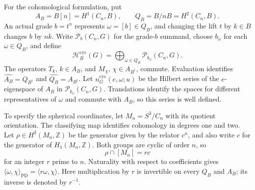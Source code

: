 \documentclass[11pt,a4paper,reqno]{amsart}
\theoremstyle{plain}
\theoremstyle{definition}
\theoremstyle{remark}
\numberwithin{equation}{section}
\newcommand{\ZZ}{\mathbb Z}
\newcommand{\cP}{\mathcal P}
\newcommand{\cH}{\mathcal H}
\newcommand{\pair}[2]{\langle #1,#2\rangle}
\begin{document}
For the cohomological formulation, put
\begin{equation}\label{eq:cyclic-cohomology}
A_B=B[n]=H^1(C_n,B),\qquad Q_B=B/nB=H^2(C_n,B).
\end{equation}
An actual grade $b=t^n$ represents $\omega=[b]\in Q_B$, and changing the lift $t$ by $k\in B$ changes $b$ by $nk$. Write $\cP_b(C_n,G)$ for the grade-$b$ summand, choose $b_\omega$ for each $\omega\in Q_B$, and define
\begin{equation}\label{eq:cyclic-H}
\cH_B^{\mathrm{cyc}}(G)=\bigoplus_{\omega\in Q_B}\cP_{b_\omega}(C_n,G).
\end{equation}
The operators $T_k$, $k\in A_B$, and $M_\chi$, $\chi\in A_{B^\dagger}$, commute. Evaluation identifies $\widehat{A_B}=Q_{B^\dagger}$ and $\widehat{Q_B}=A_{B^\dagger}$. Let $n_G^{\mathrm{cyc}}(e,\omega;u)$ be the Hilbert series of the $e$-eigenspace of $A_B$ in $\cP_{b_\omega}(C_n,G)$. Translations identify the spaces for different representatives of $\omega$ and commute with $A_B$, so this series is well defined.

To specify the spherical coordinates, let $M_n=S^3/C_n$ with its quotient orientation. The classifying map identifies cohomology in degrees one and two. Let $\rho\in H^2(M_n,\ZZ)$ be the generator given by the relator $c^n$, and also write $c$ for the generator of $H_1(M_n,\ZZ)$. Both groups are cyclic of order $n$, so
\[
\rho\cap[M_n]=r c
\]
for an integer $r$ prime to $n$. Naturality with respect to coefficients gives $\pair{\omega}{\chi}_{\mathrm{PD}}=\pair{r\omega}{\chi}$. Here multiplication by $r$ is invertible on every $Q_B$ and $A_B$; its inverse is denoted by $r^{-1}$.
\end{document}
